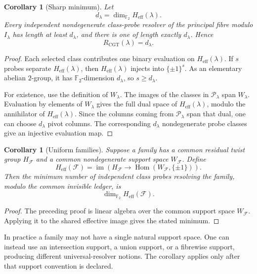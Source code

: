 \documentclass[11pt]{article}
\newtheorem{corollary}[theorem]{Corollary}
\DeclareMathOperator{\Hom}{Hom}
\begin{document}
\begin{corollary}[Sharp minimum]
Let
\[
d_\lambda=\dim_{\mathbb F_2}H_{\mathrm{eff}}(\lambda).
\]
Every independent nondegenerate class-probe resolver of the principal fibre modulo \(I_\lambda\) has length at least \(d_\lambda\), and there is one of length exactly \(d_\lambda\).  Hence
\[
R_{\mathrm{CGT}}(\lambda)=d_\lambda.
\]
\end{corollary}

\begin{proof}
Each selected class contributes one binary evaluation on \(H_{\mathrm{eff}}(\lambda)\).  If \(s\) probes separate \(H_{\mathrm{eff}}(\lambda)\), then \(H_{\mathrm{eff}}(\lambda)\) injects into \(\{\pm1\}^s\).  As an elementary abelian \(2\)-group, it has \(\mathbb F_2\)-dimension \(d_\lambda\), so \(s\ge d_\lambda\).

For existence, use the definition of \(W_\lambda\).  The images of the classes in \(\mathcal P_\lambda\) span \(W_\lambda\).  Evaluation by elements of \(W_\lambda\) gives the full dual space of \(H_{\mathrm{eff}}(\lambda)\), modulo the annihilator of \(H_{\mathrm{eff}}(\lambda)\).  Since the columns coming from \(\mathcal P_\lambda\) span that dual, one can choose \(d_\lambda\) pivot columns.  The corresponding \(d_\lambda\) nondegenerate probe classes give an injective evaluation map.
\end{proof}

\begin{corollary}[Uniform families]
Suppose a family has a common residual twist group \(H_{\mathcal F}\) and a common nondegenerate support space \(W_{\mathcal F}\).  Define
\[
H_{\mathrm{eff}}(\mathcal F)=
\operatorname{im}\left(
H_{\mathcal F}\longrightarrow\Hom(W_{\mathcal F},\{\pm1\})
\right).
\]
Then the minimum number of independent class probes resolving the family, modulo the common invisible ledger, is
\[
\dim_{\mathbb F_2}H_{\mathrm{eff}}(\mathcal F).
\]
\end{corollary}

\begin{proof}
The preceding proof is linear algebra over the common support space \(W_{\mathcal F}\).  Applying it to the shared effective image gives the stated minimum.
\end{proof}

In practice a family may not have a single natural support space.  One can instead use an intersection support, a union support, or a fibrewise support, producing different universal-resolver notions.  The corollary applies only after that support convention is declared.
\end{document}
